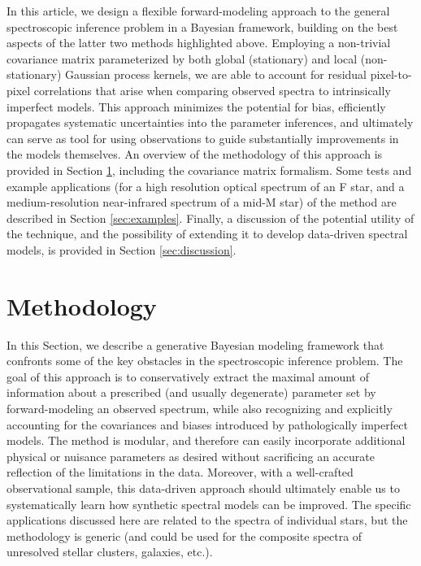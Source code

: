 \documentclass[iop,floatfix]{emulateapj}
\begin{document}
In this article, we design a flexible forward-modeling approach to the general spectroscopic 
inference problem in a Bayesian framework, building on the best aspects of the latter two methods 
highlighted above.  Employing a non-trivial covariance matrix parameterized by both global 
(stationary) and local (non-stationary) Gaussian process kernels, we are able to account for 
residual pixel-to-pixel correlations that arise when comparing observed spectra to intrinsically 
imperfect models.  This approach minimizes the potential for bias, efficiently propagates 
systematic uncertainties into the parameter inferences, and ultimately can serve as tool for using
observations to guide substantially improvements in the models themselves.  An overview of the 
methodology of this approach is provided in Section \ref{sec:method}, including the covariance 
matrix formalism.  Some tests and example applications (for a high resolution optical spectrum of 
an F star, and a medium-resolution near-infrared spectrum of a mid-M star) of the method are 
described in Section \ref{sec:examples}.  Finally, a discussion of the potential utility of the 
technique, and the possibility of extending it to develop data-driven spectral models, is provided 
in Section \ref{sec:discussion}.  \\



\section{Methodology} \label{sec:method}

In this Section, we describe a generative Bayesian modeling framework that confronts some of the 
key obstacles in the spectroscopic inference problem.  The goal of this approach is to 
conservatively extract the maximal amount of information about a prescribed (and usually 
degenerate) parameter set by forward-modeling an observed spectrum, while also recognizing and 
explicitly accounting for the covariances and biases introduced by pathologically imperfect 
models.  The method is modular, and therefore can easily incorporate additional physical or 
nuisance parameters as desired without sacrificing an accurate reflection of the limitations in the 
data.  Moreover, with a well-crafted observational sample, this data-driven approach should 
ultimately enable us to systematically learn how synthetic spectral models can be improved.  The 
specific applications discussed here are related to the spectra of individual stars, but the 
methodology is generic (and could be used for the composite spectra of unresolved stellar clusters, 
galaxies, etc.).  
\end{document}
